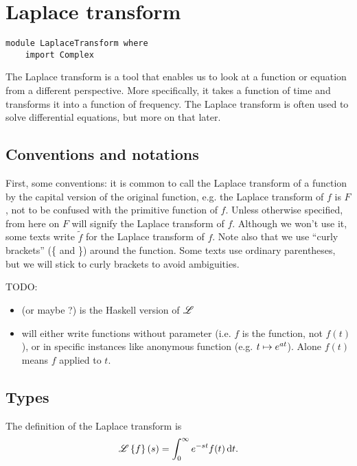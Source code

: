 
\section{Laplace transform}
\begin{verbatim}
module LaplaceTransform where
    import Complex
\end{verbatim}
The Laplace transform is a tool that enables us to look at a function or equation from a different perspective. More specifically, it takes a function of time and transforms it into a function of frequency.
The Laplace transform is often used to solve differential equations, but more on that later. 

\subsection{Conventions and notations} 
First, some conventions: it is common to call the Laplace transform of a function by the capital version of the original function, e.g. the Laplace transform of $f$ is $F$, not to be confused with the primitive function of $f$. Unless otherwise specified, from here on $F$ will signify the Laplace transform of $f$. Although we won't use it, some texts write $\widetilde{f}$ for the Laplace transform of $f$.  Note also that we use ``curly brackets'' (\{ and \}) around the function. Some texts use ordinary parentheses, but we will stick to curly brackets to avoid ambiguities. 


TODO: 
\begin{itemize}
    \item {} (or maybe ?) is the Haskell version of $\mathscr{L}$
    \item will either write functions without parameter (i.e. $f$ is the function, not $f(t)$), or in specific instances like anonymous function (e.g. $ t \mapsto e^{at}$).  Alone $f(t)$ means $f$ applied to $t$. 
\end{itemize}

\subsection{Types} 
The definition of the Laplace transform is  
\begin{equation*}
    \Lplc \left\{f\right\}(s) = \int_0^\infty e^{-st} f(t) \, \dd t. %
\end{equation*}

